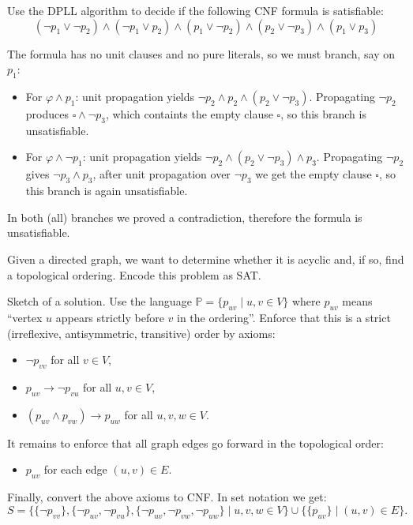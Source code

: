 \begin{problem} \label{problem:dpll}

    Use the DPLL algorithm to decide if the following CNF formula is satisfiable:
    $$ 
    (\neg p_1 \lor \neg p_2)\land( \neg p_1 \lor p_2)\land( p_1 \lor \neg p_2)\land( p_2 \lor \neg p_3)\land( p_1 \lor p_3)
    $$

    \begin{solution}
        The formula has no unit clauses and no pure literals, so we must branch, say on $p_1$:
        \begin{itemize}
            \item For $\varphi\land p_1$: unit propagation yields $\neg p_2\land p_2\land( p_2 \lor \neg p_3)$. Propagating $\neg p_2$ produces $\square\land\neg p_3$, which containts the empty clause $\square$, so this branch is unsatisfiable.
            \item For $\varphi\land \neg p_1$: unit propagation yields $\neg p_2\land( p_2 \lor \neg p_3)\land p_3$. Propagating $\neg p_2$ gives $\neg p_3\land p_3$, after unit propagation over $\neg p_3$ we get the empty clause $\square$, so this branch is again unsatisfiable.            
        \end{itemize}
        In both (all) branches we proved a contradiction, therefore the formula is unsatisfiable.                      
    \end{solution}

\end{problem}


\begin{problem}

    Given a directed graph, we want to determine whether it is acyclic and, if so, find a topological ordering. Encode this problem as SAT.

    \begin{solution}
        Sketch of a solution. Use the language $\mathbb P=\{p_{uv}\mid u,v\in V\}$ where $p_{uv}$ means “vertex $u$ appears strictly before $v$ in the ordering”. Enforce that this is a strict (irreflexive, antisymmetric, transitive) order by axioms:
        \begin{itemize}
            \item $\neg p_{vv}$ for all $v\in V$,
            \item $p_{uv}\to\neg p_{vu}$ for all $u,v\in V$,
            \item $(p_{uv}\land p_{vw})\to p_{uw}$ for all $u,v,w\in V$.
        \end{itemize}
        It remains to enforce that all graph edges go forward in the topological order:
        \begin{itemize}
            \item $p_{uv}$ for each edge $(u,v)\in E$.
        \end{itemize}
        Finally, convert the above axioms to CNF. In set notation we get:
        $$
        S=\{\{\neg p_{vv}\},\{\neg p_{uv},\neg p_{vu}\},\{\neg p_{uv},\neg p_{vw},\neg p_{uw}\} \mid u,v,w\in V\}\cup\{\{p_{uv}\}\mid(u,v)\in E\}.
        $$
    \end{solution}

\end{problem}
    
